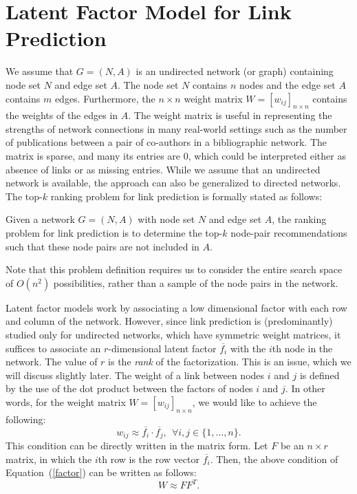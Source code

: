 \section{Latent Factor Model for Link Prediction}
\label{sec-NMF}

We assume that $G=(N, A)$ is an undirected network (or graph) containing node set $N$ and
edge set $A$. The node set $N$ contains $n$ nodes and the edge set
$A$ contains $m$ edges. Furthermore, the $n \times n$ weight matrix
$W= [w_{ij}]_{n\times n}$ contains the weights of the edges in $A$.
The weight matrix is useful in representing the strengths of network
connections in  many real-world settings such as the number of
publications between a pair of co-authors in a bibliographic
network.  The matrix is sparse, and many its entries are 0, which could be
interpreted either as absence of links or as missing entries. While
we assume that an undirected network is available, the approach can
also be generalized to directed networks.
%
 The top-$k$ ranking problem for link prediction is formally stated as follows:

\begin{definition}
Given a network $G=(N, A)$ with node set $N$ and edge set $A$, the ranking problem for link
prediction is to determine the top-$k$ node-pair recommendations such that these node pairs are not included in $A$.
\end{definition}
Note that this problem definition requires us to consider the entire
search space of $O(n^2)$ possibilities, rather than a sample of the
node pairs in the network.

Latent factor models work by associating a low dimensional factor
with each row and column of the network. However, since link
prediction is (predominantly) studied only for undirected networks,
which have symmetric weight matrices, it suffices to associate an
$r$-dimensional latent factor $\overline{f_i}$ with the $i$th node
in the network. The value of $r$ is the {\em rank} of the
factorization. This is an issue, which we will discuss slightly
later.  The weight of a link between nodes $i$ and $j$ is defined by
the use of the dot product between the factors of nodes $i$ and $j$.
In other words, for the weight matrix $W= [w_{ij}]_{n\times n}$, we
would like to achieve the following:
\begin{equation}
w_{ij} \approx \overline{f_i} \cdot \overline{f_j}, \ \ \forall i, j
\in \{ 1, \ldots, n \} \label{factor}.
\end{equation}
This condition can be directly written in the matrix form. Let $F$ be an
$n \times r$ matrix, in which the $i$th row is the row vector
$\overline{f_i}$. Then, the above condition of
Equation~(\ref{factor}) can be written as follows:
\begin{equation}
W \approx F F^T.
\end{equation}


